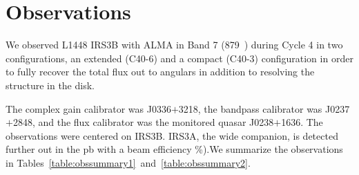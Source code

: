 \section{Observations}\label{sec:obs}

We observed L1448 IRS3B with ALMA in Band 7 (879~\micron) during Cycle 4 in two configurations, an extended (C40-6) and a compact (C40-3) configuration in order to fully recover the total \gls{flux} out to \arcsec\space \glspl{angular} in addition to resolving the structure in the disk. %

The complex gain calibrator was J0336$+$3218, the bandpass calibrator was J0237$+$2848, and the flux calibrator was the monitored quasar J0238$+$1636. The observations were centered on IRS3B. IRS3A, the wide companion, is detected further out in the \gls{pb} with a beam efficiency \%).We summarize the observations in Tables~\ref{table:obssummary1}~and~\ref{table:obssummary2}. %

